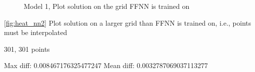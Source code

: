 \begin{figure}[H]
\qquad
{}
\caption{Model 1, Plot solution on the grid FFNN is trained on}
\label{fig:heat_nn1}
\end{figure}

\autoref{fig:heat_nn2} Plot solution on a larger grid than FFNN is trained on, i.e., points must be interpolated

301, 301 points

Max diff: 0.008467176325477247
Mean diff: 0.0032787069037113277

